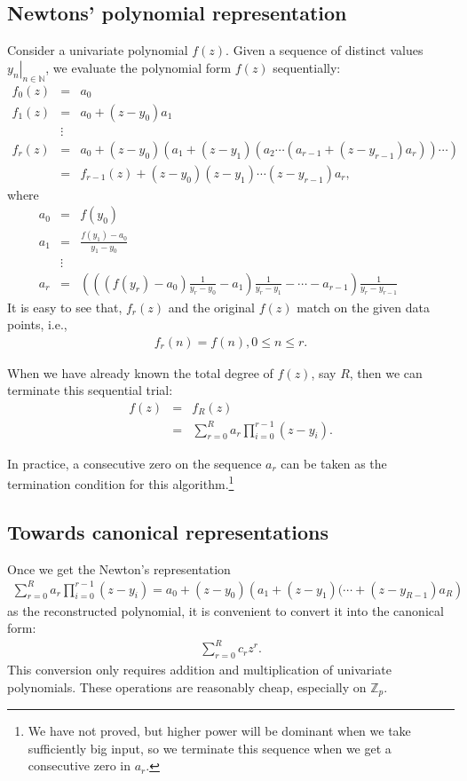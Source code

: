\documentclass[11pt]{book}
\begin{document}
\subsection{Newtons' polynomial representation}
Consider a univariate polynomial $f(z)$.
Given a sequence of distinct values $\left. y_n \right|_{n \in \mathbb{N}}$, we evaluate the polynomial form $f(z)$ sequentially:
\begin{eqnarray}
f_0(z) &=& a_0 \\
f_1(z) &=& a_0 + (z-y_0)a_1 \\
\nonumber
&\vdots& \\
f_r(z) &=& a_0 + (z-y_0) \left(a_1 + (z-y_1)\left(a_2  \cdots \left( a_{r-1} + (z - y_{r-1})a_r \right) \right) \cdots \right) \qquad \\
&=& f_{r-1}(z) + (z-y_0) (z-y_1) \cdots (z - y_{r-1})a_r,
\end{eqnarray}
where
\begin{eqnarray}
a_0 &=& f(y_0) \\
a_1 &=& \frac{f(y_1) - a_0}{y_1 - y_0} \\
\nonumber
&\vdots& \\
a_r &=& \left( \left( \left( f(y_r)-a_0 \right)\frac{1}{y_r - y_0} - a_1 \right)\frac{1}{y_r - y_1} - \cdots - a_{r-1} \right) \frac{1}{y_r - y_{r-1}} \qquad
\end{eqnarray}
It is easy to see that, $f_r(z)$ and the original $f(z)$ match on the given data points, i.e.,
\begin{eqnarray}
f_r(n) = f(n), 0 \leq n \leq r.
\end{eqnarray}

When we have already known the total degree of $f(z)$, say $R$, then we can terminate this sequential trial:
\begin{eqnarray}
f(z) &=& f_R(z) \\
&=& \sum_{r=0}^R a_r \prod_{i=0}^{r-1}(z - y_i).
\end{eqnarray}

In practice, a consecutive zero on the sequence $a_r$ can be taken as the termination condition for this algorithm.\footnote{
We have not proved, but higher power will be dominant when we take sufficiently big input, so we terminate this sequence when we get a consecutive zero in $a_r$.
}

\subsection{Towards canonical representations}
Once we get the Newton's representation
\begin{eqnarray}
\sum_{r=0}^R a_r \prod_{i=0}^{r-1}(z - y_i) = a_0 + (z-y_0) \left(a_1 + (z-y_1)(\cdots + (z - y_{R-1})a_R \right) \quad
\end{eqnarray}
as the reconstructed polynomial, it is convenient to convert it into the canonical form:
\begin{eqnarray}
\sum_{r=0}^R c_r z^r.
\end{eqnarray}
This conversion only requires addition and multiplication of univariate polynomials.
These operations are reasonably cheap, especially on $\mathbb{Z}_p$. 
\end{document}
